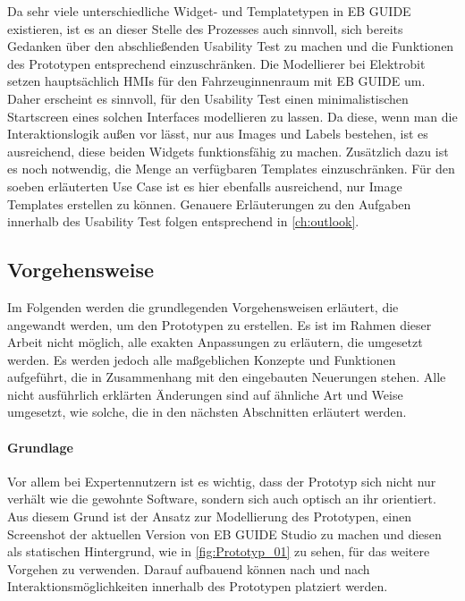 Da sehr viele unterschiedliche Widget- und Templatetypen in EB GUIDE existieren, ist es an dieser Stelle des Prozesses auch sinnvoll, sich bereits Gedanken über den abschließenden Usability Test zu machen und die Funktionen des Prototypen entsprechend einzuschränken.
Die Modellierer bei Elektrobit setzen hauptsächlich HMIs für den Fahrzeuginnenraum mit EB GUIDE um.
Daher erscheint es sinnvoll, für den Usability Test einen minimalistischen Startscreen eines solchen Interfaces modellieren zu lassen.
Da diese, wenn man die Interaktionslogik außen vor lässt, nur aus Images und Labels bestehen, ist es ausreichend, diese beiden Widgets funktionsfähig zu machen.
Zusätzlich dazu ist es noch notwendig, die Menge an verfügbaren Templates einzuschränken.
Für den soeben erläuterten Use Case ist es hier ebenfalls ausreichend, nur Image Templates erstellen zu können.
Genauere Erläuterungen zu den Aufgaben innerhalb des Usability Test folgen entsprechend in \cref{ch:outlook}.


\subsection{Vorgehensweise}
Im Folgenden werden die grundlegenden Vorgehensweisen erläutert, die angewandt werden, um den Prototypen zu erstellen.
Es ist im Rahmen dieser Arbeit nicht möglich, alle exakten Anpassungen zu erläutern, die umgesetzt werden.
Es werden jedoch alle maßgeblichen Konzepte und Funktionen aufgeführt, die in Zusammenhang mit den eingebauten Neuerungen stehen.
Alle nicht ausführlich erklärten Änderungen sind auf ähnliche Art und Weise umgesetzt, wie solche, die in den nächsten Abschnitten erläutert werden.

\paragraph{Grundlage}
Vor allem bei Expertennutzern ist es wichtig, dass der Prototyp sich nicht nur verhält wie die  gewohnte Software, sondern sich auch optisch an ihr orientiert.
Aus diesem Grund ist der Ansatz zur Modellierung des Prototypen, einen Screenshot der aktuellen Version von EB GUIDE Studio zu machen und diesen als statischen Hintergrund, wie in \cref{fig:Prototyp_01} zu sehen, für das weitere Vorgehen zu verwenden.
Darauf aufbauend können nach und nach Interaktionsmöglichkeiten innerhalb des Prototypen platziert werden.

